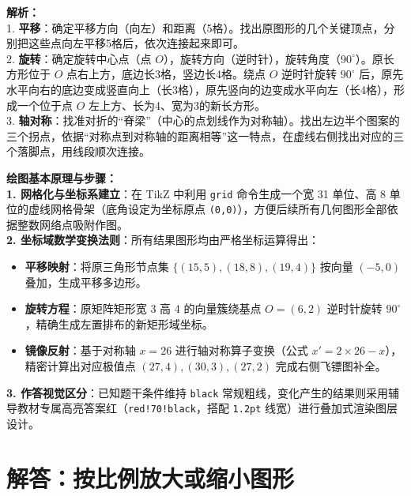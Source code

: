 \vspace{0.8cm}

{\small\color{gray}
\textbf{解析：}\\
1. \textbf{平移}：确定平移方向（向左）和距离（5格）。找出原图形的几个关键顶点，分别把这些点向左平移5格后，依次连接起来即可。\\
2. \textbf{旋转}：确定旋转中心点（点 $O$），旋转方向（逆时针），旋转角度（$90^{\circ}$）。原长方形位于 $O$ 点右上方，底边长3格，竖边长4格。绕点 $O$ 逆时针旋转 $90^{\circ}$ 后，原先水平向右的底边变成竖直向上（长3格），原先竖向的边变成水平向左（长4格），形成一个位于点 $O$ 左上方、长为4、宽为3的新长方形。\\
3. \textbf{轴对称}：找准对折的“脊梁”（中心的点划线作为对称轴）。找出左边半个图案的三个拐点，依据“对称点到对称轴的距离相等”这一特点，在虚线右侧找出对应的三个落脚点，用线段顺次连接。
}

\vspace{0.6cm}

{\small\color{blue!70!black}
\textbf{绘图基本原理与步骤：}\\
\textbf{1. 网格化与坐标系建立}：在 TikZ 中利用 \texttt{grid} 命令生成一个宽 31 单位、高 8 单位的虚线网格骨架（底角设定为坐标原点 \texttt{(0,0)}），方便后续所有几何图形全部依据整数网络点吸附作图。\\
\textbf{2. 坐标域数学变换法则}：所有结果图形均由严格坐标运算得出：
   \begin{itemize}
       \item \textbf{平移映射}：将原三角形节点集 $\{(15,5), (18,8), (19,4)\}$ 按向量 $(-5, 0)$ 叠加，生成平移多边形。
       \item \textbf{旋转方程}：原矩阵矩形宽 3 高 4 的向量簇绕基点 $O=(6,2)$ 逆时针旋转 $90^{\circ}$，精确生成左置排布的新矩形域坐标。
       \item \textbf{镜像反射}：基于对称轴 $x=26$ 进行轴对称算子变换（公式 $x' = 2 \times 26 - x$），精密计算出对应极值点 $(27,4), (30,3), (27,2)$ 完成右侧飞镖图补全。
   \end{itemize}
\textbf{3. 作答视觉区分}：已知题干条件维持 \texttt{black} 常规粗线，变化产生的结果则采用辅导教材专属高亮答案红（\texttt{red!70!black}，搭配 \texttt{1.2pt} 线宽）进行叠加式渲染图层设计。
}


\newpage



\section{解答：按比例放大或缩小图形}

